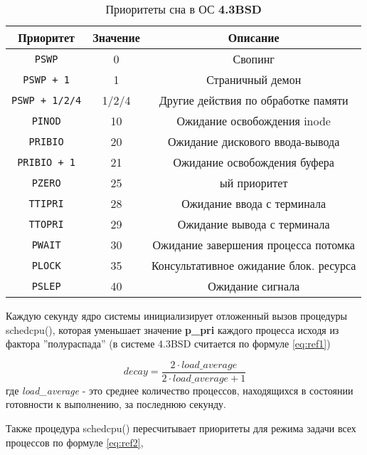 \begin{table}[h]
	\caption{Приоритеты
		сна в ОС \textbf{4.3BSD}}
	\label{tab:bsd}
	\begin{center}
		\begin{tabular}{ |c|c|c|  }
			\hline
			\textbf{Приоритет} & \textbf{Значение} & \textbf{Описание} \\
			\hline
			\texttt{PSWP} & 0 & Свопинг \\
			\hline
			\texttt{PSWP + 1} & 1 & Страничный демон \\
			\hline
			\texttt{PSWP + 1/2/4} & 1/2/4 & Другие действия по обработке памяти \\
			\hline
			\texttt{PINOD} & 10 & Ожидание освобождения inode \\
			\hline
			\texttt{PRIBIO} & 20 & Ожидание дискового ввода-вывода \\
			\hline
			\texttt{PRIBIO + 1} & 21 & Ожидание освобождения буфера \\
			\hline
			\texttt{PZERO} & 25 & ый приоритет \\
			\hline
			\texttt{TTIPRI} & 28 & Ожидание ввода с терминала \\
			\hline
			\texttt{TTOPRI} & 29 & Ожидание вывода с терминала \\
			\hline 
			\texttt{PWAIT} & 30 & Ожидание завершения процесса потомка \\
			\hline
			\texttt{PLOCK} & 35 & Консультативное ожидание блок. ресурса \\
			\hline
			\texttt{PSLEP} & 40 & Ожидание сигнала \\
			\hline
		\end{tabular}
	\end{center}
\end{table}

Каждую секунду ядро системы инициализирует отложенный вызов процедуры schedcpu(), которая уменьшает значение \textbf{p\_pri} каждого процесса исходя из фактора ''полураспада'' (в системе 4.3BSD считается по формуле \ref{eq:ref1})

\begin{equation}
\label{eq:ref1}
decay = \frac{2 \cdot load\_average}{2 \cdot load\_average + 1}
\end{equation} где
\textit{load\_average} - это среднее количество процессов, находящихся в состоянии готовности к выполнению, за последнюю секунду.

Также процедура schedcpu() пересчитывает приоритеты для режима задачи
всех процессов по формуле \ref{eq:ref2},

